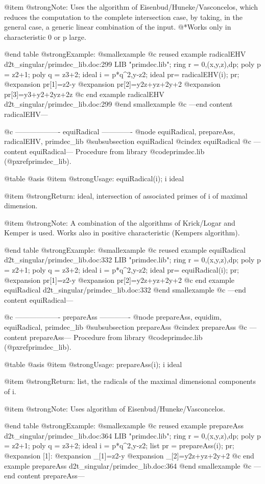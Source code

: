 @item @strong{Note:}
Uses the algorithm of Eisenbud/Huneke/Vasconcelos, which
reduces the computation to the complete intersection case,
by taking, in the general case, a generic linear combination
of the input.
@*Works only in characteristic 0 or p large.

@end table
@strong{Example:}
@smallexample
@c reused example radicalEHV d2t_singular/primdec_lib.doc:299 
LIB "primdec.lib";
ring  r = 0,(x,y,z),dp;
poly  p = z2+1;
poly  q = z3+2;
ideal i = p*q^2,y-z2;
ideal pr= radicalEHV(i);
pr;
@expansion{} pr[1]=z2-y
@expansion{} pr[2]=y2z+yz+2y+2
@expansion{} pr[3]=y3+y2+2yz+2z
@c end example radicalEHV d2t_singular/primdec_lib.doc:299
@end smallexample
@c ---end content radicalEHV---

@c ------------------- equiRadical -------------
@node equiRadical, prepareAss, radicalEHV, primdec_lib
@subsubsection equiRadical
@cindex equiRadical
@c ---content equiRadical---
Procedure from library @code{primdec.lib} (@pxref{primdec_lib}).

@table @asis
@item @strong{Usage:}
equiRadical(i); i ideal

@item @strong{Return:}
ideal, intersection of associated primes of i of maximal dimension.

@item @strong{Note:}
A combination of the algorithms of Krick/Logar and Kemper is used.
Works also in positive characteristic (Kempers algorithm).

@end table
@strong{Example:}
@smallexample
@c reused example equiRadical d2t_singular/primdec_lib.doc:332 
LIB "primdec.lib";
ring  r = 0,(x,y,z),dp;
poly  p = z2+1;
poly  q = z3+2;
ideal i = p*q^2,y-z2;
ideal pr= equiRadical(i);
pr;
@expansion{} pr[1]=z2-y
@expansion{} pr[2]=y2z+yz+2y+2
@c end example equiRadical d2t_singular/primdec_lib.doc:332
@end smallexample
@c ---end content equiRadical---

@c ------------------- prepareAss -------------
@node prepareAss, equidim, equiRadical, primdec_lib
@subsubsection prepareAss
@cindex prepareAss
@c ---content prepareAss---
Procedure from library @code{primdec.lib} (@pxref{primdec_lib}).

@table @asis
@item @strong{Usage:}
prepareAss(i); i ideal

@item @strong{Return:}
list, the radicals of the maximal dimensional components of i.

@item @strong{Note:}
Uses algorithm of Eisenbud/Huneke/Vasconcelos.

@end table
@strong{Example:}
@smallexample
@c reused example prepareAss d2t_singular/primdec_lib.doc:364 
LIB "primdec.lib";
ring  r = 0,(x,y,z),dp;
poly  p = z2+1;
poly  q = z3+2;
ideal i = p*q^2,y-z2;
list pr = prepareAss(i);
pr;
@expansion{} [1]:
@expansion{}    _[1]=z2-y
@expansion{}    _[2]=y2z+yz+2y+2
@c end example prepareAss d2t_singular/primdec_lib.doc:364
@end smallexample
@c ---end content prepareAss---

